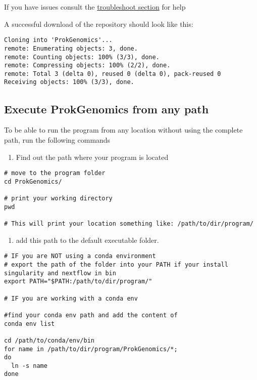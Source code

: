 \documentclass[
]{book}
\providecommand{\tightlist}{%
  \setlength{\itemsep}{0pt}\setlength{\parskip}{0pt}}
\begin{document}
If you have issues consult the \href{troubleshooting.html}{troubleshoot section} for help

A successful download of the repository should look like this:

\begin{verbatim}
Cloning into 'ProkGenomics'...
remote: Enumerating objects: 3, done.
remote: Counting objects: 100% (3/3), done.
remote: Compressing objects: 100% (2/2), done.
remote: Total 3 (delta 0), reused 0 (delta 0), pack-reused 0
Receiving objects: 100% (3/3), done.
\end{verbatim}

\hypertarget{execute-prokgenomics-from-any-path}{%
\subsection{Execute ProkGenomics from any path}\label{execute-prokgenomics-from-any-path}}

To be able to run the program from any location without using the complete path, run the following commands

\begin{enumerate}
\def\labelenumi{\arabic{enumi}.}
\tightlist
\item
  Find out the path where your program is located
\end{enumerate}

\begin{verbatim}
# move to the program folder
cd ProkGenomics/

# print your working directory
pwd 

# This will print your location something like: /path/to/dir/program/
\end{verbatim}

\begin{enumerate}
\def\labelenumi{\arabic{enumi}.}
\setcounter{enumi}{1}
\tightlist
\item
  add this path to the default executable folder.
\end{enumerate}

\begin{verbatim}
# IF you are NOT using a conda environment 
# export the path of the folder into your PATH if your install singularity and nextflow in bin
export PATH="$PATH:/path/to/dir/program/"

# IF you are working with a conda env

#find your conda env path and add the content of 
conda env list

cd /path/to/conda/env/bin
for name in /path/to/dir/program/ProkGenomics/*; 
do
  ln -s name
done
\end{verbatim}
\end{document}
